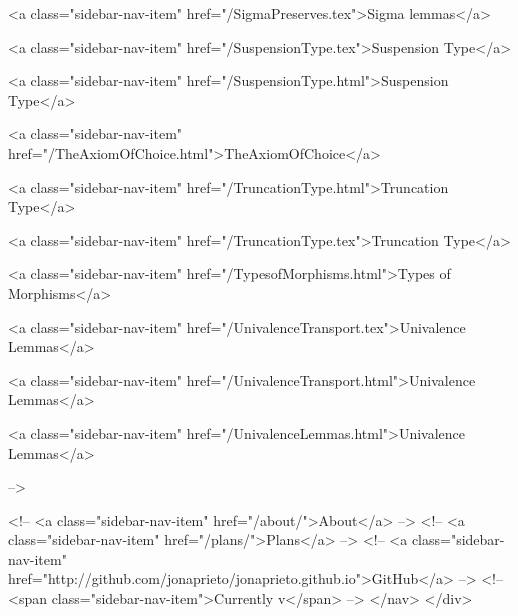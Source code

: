       
    
      
        
          <a class="sidebar-nav-item" href="/SigmaPreserves.tex">Sigma lemmas</a>
        
      
    
      
        
          <a class="sidebar-nav-item" href="/SuspensionType.tex">Suspension Type</a>
        
      
    
      
        
          <a class="sidebar-nav-item" href="/SuspensionType.html">Suspension Type</a>
        
      
    
      
        
          <a class="sidebar-nav-item" href="/TheAxiomOfChoice.html">TheAxiomOfChoice</a>
        
      
    
      
        
          <a class="sidebar-nav-item" href="/TruncationType.html">Truncation Type</a>
        
      
    
      
        
          <a class="sidebar-nav-item" href="/TruncationType.tex">Truncation Type</a>
        
      
    
      
        
          <a class="sidebar-nav-item" href="/TypesofMorphisms.html">Types of Morphisms</a>
        
      
    
      
        
          <a class="sidebar-nav-item" href="/UnivalenceTransport.tex">Univalence Lemmas</a>
        
      
    
      
        
          <a class="sidebar-nav-item" href="/UnivalenceTransport.html">Univalence Lemmas</a>
        
      
    
      
        
          <a class="sidebar-nav-item" href="/UnivalenceLemmas.html">Univalence Lemmas</a>
        
      
     -->

    <!-- <a class="sidebar-nav-item" href="/about/">About</a> -->
    <!-- <a class="sidebar-nav-item" href="/plans/">Plans</a> -->
    <!-- <a class="sidebar-nav-item" href="http://github.com/jonaprieto/jonaprieto.github.io">GitHub</a> -->
    <!-- <span class="sidebar-nav-item">Currently v</span> -->
  </nav>
</div>

